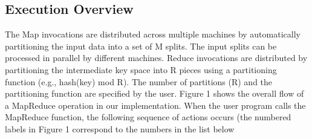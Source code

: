 \documentclass{article}
\begin{document}
\subsection{Execution Overview}
The Map invocations are distributed across multiple
machines by automatically partitioning the input data
into a set of M splits. The input splits can be processed in parallel by different machines. Reduce invocations are distributed by partitioning the intermediate key
space into R pieces using a partitioning function (e.g.,
hash(key) mod R). The number of partitions (R) and
the partitioning function are specified by the user.
Figure 1 shows the overall flow of a MapReduce operation in our implementation. When the user program
calls the MapReduce function, the following sequence
of actions occurs (the numbered labels in Figure 1 correspond to the numbers in the list below
\end{document}
